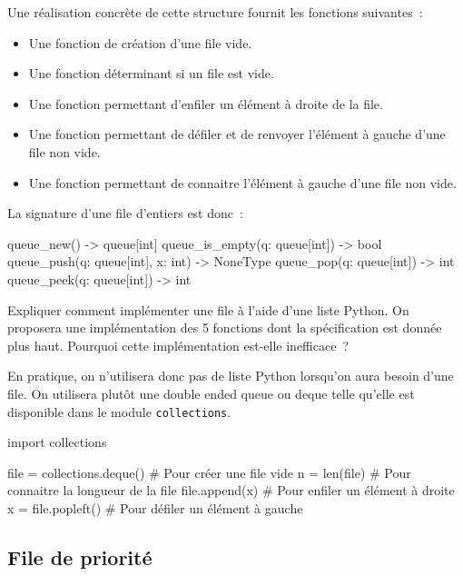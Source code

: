\documentclass{magnolia}
\begin{document}
Une réalisation concrète de cette structure fournit les
fonctions suivantes~:
\begin{itemize}
\item Une fonction de création d'une file vide.
\item Une fonction déterminant si un file est vide.
\item Une fonction permettant d'enfiler un élément à droite de la file.
\item Une fonction permettant de défiler et de renvoyer l'élément à gauche d'une file non vide.
\item Une fonction permettant de connaitre l'élément à gauche d'une file non vide.
\end{itemize}
La signature d'une file d'entiers est donc~:
\begin{pythoncode}
queue_new() -> queue[int]
queue_is_empty(q: queue[int]) -> bool
queue_push(q: queue[int], x: int) -> NoneType
queue_pop(q: queue[int]) -> int
queue_peek(q: queue[int]) -> int
\end{pythoncode}
\begin{exoUnique}
\exo Expliquer comment implémenter une file à l'aide d'une liste Python. On proposera une
  implémentation des 5 fonctions dont la spécification est donnée plus haut. Pourquoi cette
  implémentation est-elle inefficace~?
\end{exoUnique}

\vspace{2ex}
En pratique, on n'utilisera donc pas de liste Python lorsqu'on aura besoin d'une
file. On utilisera plutôt une \og double ended queue \fg ou \og deque \fg telle
qu'elle est disponible dans le module \verb!collections!.

\begin{pythoncode}
import collections

file = collections.deque() # Pour créer une file vide
n = len(file)              # Pour connaitre la longueur de la file
file.append(x)             # Pour enfiler un élément à droite
x = file.popleft()         # Pour défiler un élément à gauche
\end{pythoncode}

\subsection{File de priorité}
\end{document}
